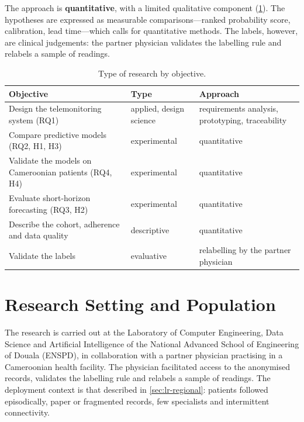 The approach is \textbf{quantitative}, with a limited qualitative component (\cref{tab:research-type}). The hypotheses are expressed as measurable comparisons---ranked probability score, calibration, lead time---which calls for quantitative methods. The labels, however, are clinical judgements: the partner physician validates the labelling rule and relabels a sample of readings.

\begin{table}[htbp]
\centering\small
\caption{Type of research by objective.}\label{tab:research-type}
\begin{tabularx}{\textwidth}{@{}X >{\raggedright\arraybackslash}p{3.0cm} >{\raggedright\arraybackslash}p{3.6cm}@{}}
\toprule
\textbf{Objective} & \textbf{Type} & \textbf{Approach} \\
\midrule
Design the telemonitoring system (RQ1) & applied, design science & requirements analysis, prototyping, traceability \\
Compare predictive models (RQ2, H1, H3) & experimental & quantitative \\
Validate the models on Cameroonian patients (RQ4, H4) & experimental & quantitative \\
Evaluate short-horizon forecasting (RQ3, H2) & experimental & quantitative \\
Describe the cohort, adherence and data quality & descriptive & quantitative \\
Validate the labels & evaluative & relabelling by the partner physician \\
\bottomrule
\end{tabularx}
\end{table}

\section{Research Setting and Population}\label{sec:setting}

The research is carried out at the Laboratory of Computer Engineering, Data Science and Artificial Intelligence of the National Advanced School of Engineering of Douala (ENSPD), in collaboration with a partner physician practising in a Cameroonian health facility. The physician facilitated access to the anonymised records, validates the labelling rule and relabels a sample of readings. The deployment context is that described in \cref{sec:lr-regional}: patients followed episodically, paper or fragmented records, few specialists and intermittent connectivity.

